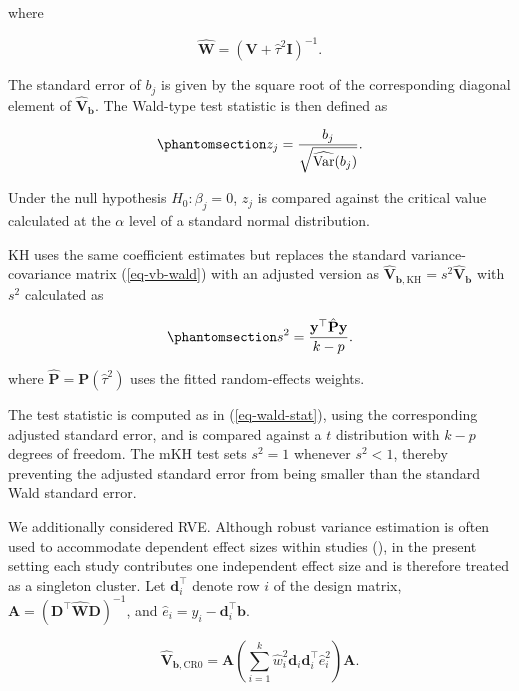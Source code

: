 \documentclass[
  man,
  longtable,
  nolmodern,
  notxfonts,
  notimes,
  colorlinks=true,linkcolor=blue,citecolor=blue,urlcolor=blue]{apa7}
\begin{document}
where

\[
\hat{\mathbf{W}}
=
(\mathbf{V}+\hat{\tau}^2\mathbf{I})^{-1}.
\]

The standard error of \(b_j\) is given by the square root of the
corresponding diagonal element of \(\hat{\mathbf{V}}_{\mathbf{b}}\). The
Wald-type test statistic is then defined as

\begin{equation}\phantomsection\label{eq-wald-stat}{
z_j
=
\frac{b_j}{\sqrt{\widehat{\operatorname{Var}}(b_j)}}.
}\end{equation}

Under the null hypothesis \(H_0:\beta_j = 0\), \(z_j\) is compared
against the critical value calculated at the \(\alpha\) level of a
standard normal distribution.

KH uses the same coefficient estimates but replaces the standard
variance-covariance matrix (\ref{eq-vb-wald}) with an adjusted version
as
\(\hat{\mathbf{V}}_{\mathbf{b},\mathrm{KH}} = s^2 \hat{\mathbf{V}}_{\mathbf{b}}\)
with \(s^2\) calculated as

\begin{equation}\phantomsection\label{eq-kh-scale}{
s^2
=
\frac{
\mathbf{y}^{\top}\hat{\mathbf{P}}\mathbf{y}
}{
k-p
}.
}\end{equation}

where \(\hat{\mathbf{P}}=\mathbf{P}(\hat{\tau}^2)\) uses the fitted
random-effects weights.

The test statistic is computed as in (\ref{eq-wald-stat}), using the
corresponding adjusted standard error, and is compared against a \(t\)
distribution with \(k-p\) degrees of freedom. The mKH test sets
\(s^2 = 1\) whenever \(s^2 < 1\), thereby preventing the adjusted
standard error from being smaller than the standard Wald standard error.

We additionally considered RVE. Although robust variance estimation is
often used to accommodate dependent effect sizes within studies
(), in the present
setting each study contributes one independent effect size and is
therefore treated as a singleton cluster. Let \(\mathbf{d}_i^{\top}\)
denote row \(i\) of the design matrix,
\(\mathbf{A}=(\mathbf{D}^{\top}\hat{\mathbf{W}}\mathbf{D})^{-1}\), and
\(\hat e_i=y_i-\mathbf{d}_i^{\top}\mathbf{b}\).

\[
\widehat{\mathbf{V}}_{\mathbf{b},\mathrm{CR0}}
=
\mathbf{A}
\left(
\sum_{i=1}^{k}
\hat w_i^2
\mathbf{d}_i\mathbf{d}_i^{\top}
\hat e_i^2
\right)
\mathbf{A}.
\]
\end{document}
